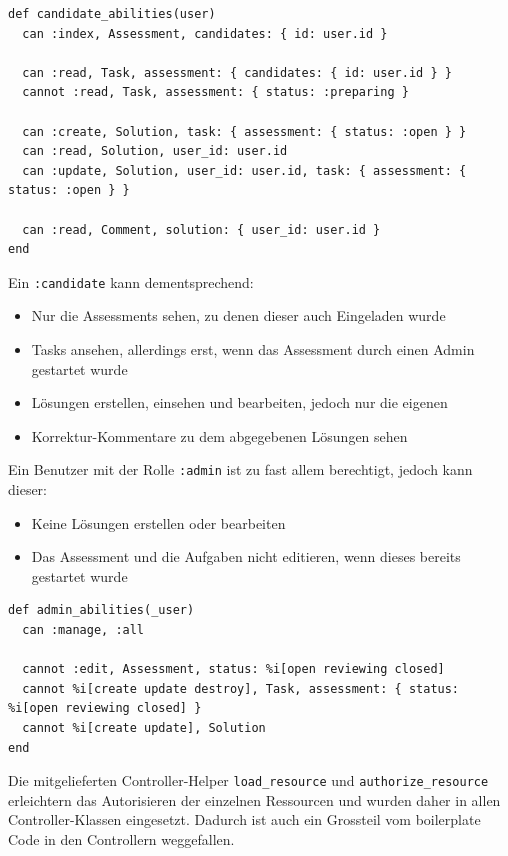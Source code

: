 \begin{codebox}
\begin{verbatim}
def candidate_abilities(user)
  can :index, Assessment, candidates: { id: user.id }

  can :read, Task, assessment: { candidates: { id: user.id } }
  cannot :read, Task, assessment: { status: :preparing }

  can :create, Solution, task: { assessment: { status: :open } }
  can :read, Solution, user_id: user.id
  can :update, Solution, user_id: user.id, task: { assessment: { status: :open } }

  can :read, Comment, solution: { user_id: user.id }
end
\end{verbatim}
\end{codebox}

Ein \texttt{:candidate} kann dementsprechend:
\begin{itemize}
  \item Nur die Assessments sehen, zu denen dieser auch Eingeladen wurde
  \item Tasks ansehen, allerdings erst, wenn das Assessment durch einen Admin gestartet wurde
  \item Lösungen erstellen, einsehen und bearbeiten, jedoch nur die eigenen
  \item Korrektur-Kommentare zu dem abgegebenen Lösungen sehen
\end{itemize}

\newpage

Ein Benutzer mit der Rolle \texttt{:admin} ist zu fast allem berechtigt, jedoch kann dieser:
\begin{itemize}
  \item Keine Lösungen erstellen oder bearbeiten
  \item Das Assessment und die Aufgaben nicht editieren, wenn dieses bereits gestartet wurde
\end{itemize}

\begin{codebox}
\begin{verbatim}
def admin_abilities(_user)
  can :manage, :all

  cannot :edit, Assessment, status: %i[open reviewing closed]
  cannot %i[create update destroy], Task, assessment: { status: %i[open reviewing closed] }
  cannot %i[create update], Solution
end
\end{verbatim}
\end{codebox}
  
Die mitgelieferten Controller-Helper \texttt{load_resource} und \texttt{authorize_resource} erleichtern 
das Autorisieren der einzelnen Ressourcen und wurden daher in allen Controller-Klassen eingesetzt. Dadurch ist auch ein Grossteil vom \gls{boilerplate} Code
in den Controllern weggefallen.

